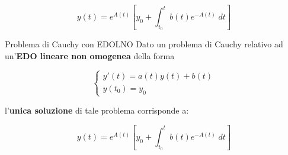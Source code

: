 \documentclass[a4paper, 12pt]{report}
\begin{document}
    \[ y(t) = e^{A(t)} \left [ y_0 + \int_{t_0}^{t} b(t)e^{-A(t)} \; dt \right ] \]
    
    \quad
    
    \begin{frameddefn}{Problema di Cauchy con EDOLNO}
        Dato un problema di Cauchy relativo ad un'\textbf{EDO lineare non omogenea} della forma
        
        $$
        \left \{ \begin{array}{l}
            y'(t) = a(t) y(t) + b(t)\\
            y(t_0) = y_0
        \end{array}\right .
        $$
        
        l'\textbf{unica soluzione} di tale problema corrisponde a:
        
        \[ y(t) = e^{A(t)} \left [ y_0 + \int_{t_0}^{t} b(t)e^{-A(t)} \; dt \right ] \]
    \end{frameddefn}
    
    \newpage
    
\end{document}
